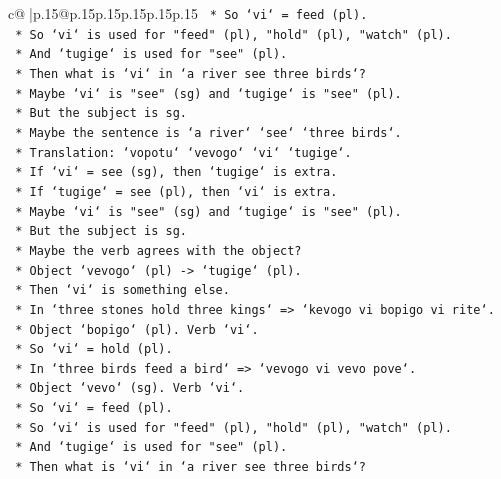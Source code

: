 \documentclass{article}
\begin{document}
{\begin{supertabular}{c@{$\;$}|p{.15\linewidth}@{}p{.15\linewidth}p{.15\linewidth}p{.15\linewidth}p{.15\linewidth}p{.15\linewidth}}
{{{\texttt{                *   So `vi` = feed (pl).} \\
\texttt{                *   So `vi` is used for "feed" (pl), "hold" (pl), "watch" (pl).} \\
\texttt{                *   And `tugige` is used for "see" (pl).} \\
\texttt{                *   Then what is `vi` in `a river see three birds`?} \\
\texttt{                *   Maybe `vi` is "see" (sg) and `tugige` is "see" (pl).} \\
\texttt{                *   But the subject is sg.} \\
\texttt{                *   Maybe the sentence is `a river` `see` `three birds`.} \\
\texttt{                *   Translation: `vopotu` `vevogo` `vi` `tugige`.} \\
\texttt{                *   If `vi` = see (sg), then `tugige` is extra.} \\
\texttt{                *   If `tugige` = see (pl), then `vi` is extra.} \\
\texttt{                *   Maybe `vi` is "see" (sg) and `tugige` is "see" (pl).} \\
\texttt{                *   But the subject is sg.} \\
\texttt{                *   Maybe the verb agrees with the object?} \\
\texttt{                *   Object `vevogo` (pl) {-}> `tugige` (pl).} \\
\texttt{                *   Then `vi` is something else.} \\
\texttt{                *   In `three stones hold three kings` => `kevogo vi bopigo vi rite`.} \\
\texttt{                *   Object `bopigo` (pl). Verb `vi`.} \\
\texttt{                *   So `vi` = hold (pl).} \\
\texttt{                *   In `three birds feed a bird` => `vevogo vi vevo pove`.} \\
\texttt{                *   Object `vevo` (sg). Verb `vi`.} \\
\texttt{                *   So `vi` = feed (pl).} \\
\texttt{                *   So `vi` is used for "feed" (pl), "hold" (pl), "watch" (pl).} \\
\texttt{                *   And `tugige` is used for "see" (pl).} \\
\texttt{                *   Then what is `vi` in `a river see three birds`?} \\
}}}
\end{supertabular}}
\end{document}

